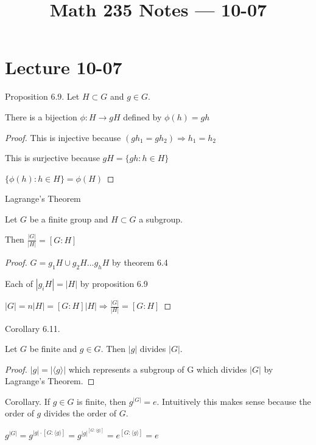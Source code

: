 \documentclass[class=scrartcl, crop=false]{standalone}
\title{Math 235 Notes --- 10-07}
\begin{document}
\section{Lecture 10-07}


\begin{theorem}
  Proposition 6.9. Let $H \subset G$ and  $g \in G$.

  There is a bijection $\phi :H\to gH$ defined by $\phi(h) = gh$ 
  \begin{proof}
    This is injective because $(gh_1 = gh_2) \Rightarrow h_1 = h_2$ 

    This is surjective because $gH = \{gh: h \in H\}$ 

    $\{\phi(h): h \in H\} = \phi(H)$
  \end{proof}
\end{theorem}

\begin{theorem}
  Lagrange's Theorem

  Let $G$ be a finite group and $H \subset G$ a subgroup.

  Then $\frac{|G|}{|H|} = \left[G:H\right]$


  \begin{proof}
    $G = g_1H \cup g_2H \dots g_hH$ by theorem 6.4

    Each of $|g_iH| = |H|$ by proposition 6.9

    $|G| = n|H| = \left[G:H\right]|H| \Rightarrow \frac{|G|}{|H|} = \left[G:H\right]$ 
  \end{proof}
\end{theorem}

\begin{theorem}
  Corollary 6.11.

  Let $G$ be finite and $g \in G$. Then $|g|$ divides $|G|$.

  \begin{proof}
    $|g| = |\langle g \rangle|$ which represents a subgroup of G which divides  $|G|$ by Lagrange's Theorem.
  \end{proof}
\end{theorem}

\begin{theorem}
  Corollary. If $g \in G$ is finite, then $g^{|G|} = e$. Intuitively this makes sense because the order of $g$ divides the order of $G$.

  $g^{|G|} = g^{|g| \cdot \left[G:\langle g \rangle \right]} = g^{|g|^{\left[G:\langle g \rangle \right]}} = e^{\left[G:\langle g \rangle \right]} = e$
\end{theorem}
\end{document}
